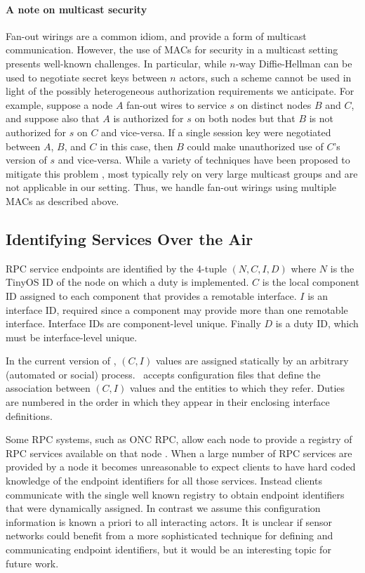 \paragraph{A note on multicast security} Fan-out wirings are a common
idiom, and provide a form of multicast communication. However, the use
of MACs for security in a multicast setting presents well-known
challenges. In particular, while $n$-way Diffie-Hellman can be used to
negotiate secret keys between $n$ actors, such a scheme cannot be used
in light of the possibly heterogeneous authorization requirements we
anticipate. For example, suppose a node $A$ fan-out wires to service $s$
on distinct nodes $B$ and $C$, and suppose also that $A$ is authorized
for $s$ on both nodes but that $B$ is not authorized for $s$ on $C$ and
vice-versa. If a single session key were negotiated between $A$, $B$,
and $C$ in this case, then $B$ could make unauthorized use of $C$'s
version of $s$ and vice-versa. While a variety of techniques have been
proposed to mitigate this problem \cite{canetti-1999}, most typically
rely on very large multicast groups and are not applicable in our
setting. Thus, we handle fan-out wirings using multiple MACs as
described above.

\subsection{Identifying Services Over the Air}

RPC service endpoints are identified by the 4-tuple $(N, C, I, D)$ where
$N$ is the TinyOS ID of the node on which a duty is implemented. $C$ is
the local component ID assigned to each component that provides a
remotable interface. $I$ is an interface ID, required since a component
may provide more than one remotable interface. Interface IDs are
component-level unique. Finally $D$ is a duty ID, which must be
interface-level unique.

In the current version of \Sprocket, $(C, I)$ values are assigned
statically by an arbitrary (automated or social) process. \Sprocket\
accepts configuration files that define the association between $(C, I)$
values and the entities to which they refer. Duties are numbered in the
order in which they appear in their enclosing interface definitions.

Some RPC systems, such as ONC RPC, allow each node to provide a registry
of RPC services available on that node \cite{RFC-1833}. When a large
number of RPC services are provided by a node it becomes unreasonable to
expect clients to have hard coded knowledge of the endpoint identifiers
for all those services. Instead clients communicate with the single well
known registry to obtain endpoint identifiers that were dynamically
assigned. In contrast we assume this configuration information is known
a priori to all interacting actors. It is unclear if sensor networks
could benefit from a more sophisticated technique for defining and
communicating endpoint identifiers, but it would be an interesting topic
for future work.

